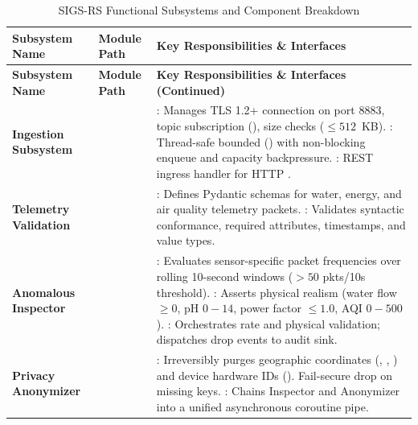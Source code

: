\documentclass[a4paper]{article}
\begin{document}
\begingroup
\small
\begin{xltabular}{\linewidth}{@{}p{2.8cm} >{\raggedright\arraybackslash}p{3.2cm} X@{}}
\caption{SIGS-RS Functional Subsystems and Component Breakdown} \label{tab:working_modules} \\
\toprule
\textbf{Subsystem Name} & \textbf{Module Path} & \textbf{Key Responsibilities \& Interfaces} \\
\midrule
\endfirsthead
\toprule
\textbf{Subsystem Name} & \textbf{Module Path} & \textbf{Key Responsibilities \& Interfaces (Continued)} \\
\midrule
\endhead
\bottomrule
\endfoot
\textbf{Ingestion Subsystem} &  & 
\textbf{}: Manages TLS 1.2+ connection on port 8883, topic subscription (), size checks ($\le 512$~KB). \newline
\textbf{}: Thread-safe bounded  () with non-blocking enqueue and capacity backpressure. \newline
\textbf{}: REST ingress handler for HTTP . \\
\midrule
\textbf{Telemetry Validation} &  & 
\textbf{}: Defines Pydantic schemas for water, energy, and air quality telemetry packets. \newline
\textbf{}: Validates syntactic conformance, required attributes, timestamps, and value types. \\
\midrule
\textbf{Anomalous Inspector} &  & 
\textbf{}: Evaluates sensor-specific packet frequencies over rolling 10-second windows ($> 50$ pkts/10s threshold). \newline
\textbf{}: Asserts physical realism (water flow $\ge 0$, pH $0-14$, power factor $\le 1.0$, AQI $0-500$). \newline
\textbf{}: Orchestrates rate and physical validation; dispatches drop events to audit sink. \\
\midrule
\textbf{Privacy Anonymizer} &  & 
\textbf{}: Irreversibly purges geographic coordinates (, , ) and device hardware IDs (). Fail-secure drop on missing keys. \newline
\textbf{}: Chains Inspector and Anonymizer into a unified asynchronous coroutine pipe. \\

\end{xltabular}
\end{document}
